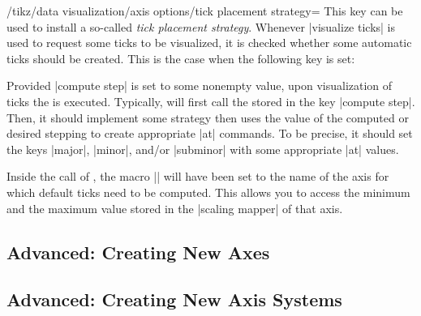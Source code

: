\begin{key}{/tikz/data visualization/axis options/tick placement strategy=}
  This key can be used to install a so-called \emph{tick placement
    strategy}. Whenever |visualize ticks| is used to request some
  ticks to be visualized, it is checked whether some automatic ticks
  should be created. This is the case when the following key is set:

  Provided |compute step| is set to some nonempty value, upon
  visualization of ticks the  is executed. Typically,
   will first call the  stored in the key
  |compute step|. Then, it should implement some strategy then uses
  the value of the computed or desired stepping to create appropriate
  |at| commands. To be precise, it should set the keys |major|,
  |minor|, and/or |subminor| with some appropriate |at| values.

  Inside the call of , the macro |\tikzdvaxis| will have
  been set to the name of the axis for which default ticks need to be
  computed. This allows you to access the minimum and the maximum
  value stored in the |scaling mapper| of that axis.
  \begin{codeexample}[]
\def\silly{
  \tikzdatavisualizationset{major={at={2,3,5,7,11,13}}}
}
\end{codeexample}
\end{key}

\subsection{Advanced: Creating New Axes}

\subsection{Advanced: Creating New Axis Systems}
